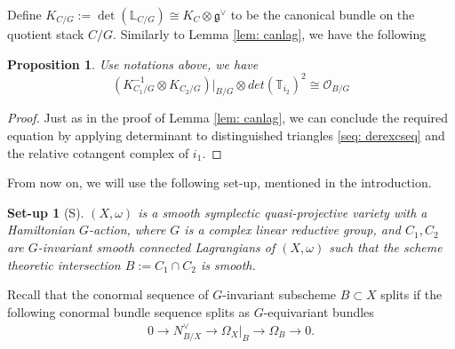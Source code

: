 \documentclass[12pt]{amsart}
\newtheorem{lemma}[theorem]{Lemma}
\newtheorem{proposition}[theorem]{Proposition}
\newtheorem*{setup}{Set-up}
\theoremstyle{definition}
\theoremstyle{remark}
\numberwithin{equation}{section}
\newcommand{\LL}{\mathbb{L}}
\newcommand{\TT}{\mathbb{T}}
\newcommand{\shO}{\mathcal{O}}
\newcommand{\Ext}{\operatorname{Ext}}
\newcommand{\arw}{\longrightarrow}
\newcommand{\Hdot}{\operatorname{H}}
\begin{document}
  Define $K_{C/G}:=\det(\LL_{C/G})\cong K_C\otimes \mathfrak{g}^{\vee}$ to be the canonical bundle on the quotient stack $C/G$. Similarly to Lemma \ref{lem: canlag}, we have the following
\begin{proposition}\label{prop: eqcanlag}
Use notations above, we have 
    $$(K^{-1}_{C_1/G}\otimes K_{C_2/G})|_{B/G}\otimes det(\TT_{i_2})^2\cong \shO_{B/G}$$
\end{proposition}
\begin{proof}
    Just as in the proof of Lemma \ref{lem: canlag}, we can conclude the required equation by applying determinant to distinguished triangles \ref{seq: derexcseq} and the relative cotangent complex of $i_1$. 
\end{proof}
%
%
%
From now on, we will use the following set-up, mentioned in the introduction. 
\begin{setup}[S]
$(X,\omega)$ is a smooth symplectic quasi-projective variety with a Hamiltonian $G$-action, where $G$ is a complex linear reductive group, and $C_1, C_2$ are $G$-invariant smooth connected Lagrangians of $(X, \omega)$ such that the scheme theoretic intersection $B:=C_1\cap C_2$ is smooth.
\end{setup}
Recall that the conormal sequence of $G$-invariant subscheme $B\subset X$ splits if the following conormal bundle sequence splits as $G$-equivariant bundles
\begin{align*}
    0\arw N^{\vee}_{B/X}\arw \Omega_X|_B \arw \Omega_B\arw 0. 
 \end{align*}
\end{document}
